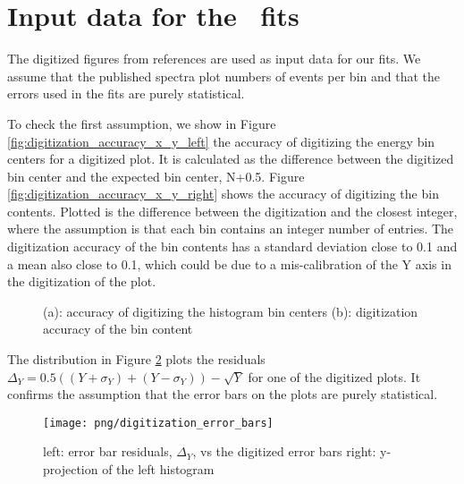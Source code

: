 \section { Input data for the \kmax\ fits}

The digitized figures from references \cite{RMC_1992_PhysRevC.46.1094,RMC_1999_PhysRevC.59.2853}
are used as input data for our fits. We assume that the published spectra plot numbers of events
per bin and that the errors used in the fits are purely statistical.

To check the first assumption, we show in Figure \ref{fig:digitization_accuracy_x_y_left} the accuracy
of digitizing the energy bin centers for a digitized plot. It is calculated as the difference between 
the digitized bin center and the expected bin center, N+0.5.
Figure \ref{fig:digitization_accuracy_x_y_right} shows the accuracy of digitizing the bin contents.
Plotted is the difference between the digitization and the closest integer, where the assumption is that 
each bin contains an integer number of entries. The digitization accuracy of the bin contents has
a standard deviation close to 0.1 and a mean also close to 0.1, which could be due to a
mis-calibration of the Y axis in the digitization of the plot.

\begin{figure}[htbp]
  \begin{center}
  \end{center}
  \caption{
    (a): accuracy of digitizing the histogram bin centers
    (b): digitization accuracy of the bin content
  }
  \label{fig:digitization_accuracy_x_y}
\end{figure}

The distribution in Figure \ref{fig:digitization_accuracy_error_bars} plots the residuals
$\Delta_Y = 0.5((Y+\sigma_Y) + (Y-\sigma_Y)) - \sqrt{Y}$ for one of the digitized plots.
It confirms the assumption that the error bars on the plots are purely statistical.

\begin{figure}[htbp]
  \begin{center}
    \texttt{[image: png/digitization\_error\_bars]} 
  \end{center}
  \caption{
    left: error bar residuals, $\Delta_Y$, vs the digitized error bars
    right: y-projection of the left histogram
  }
  \label{fig:digitization_accuracy_error_bars}
\end{figure}


